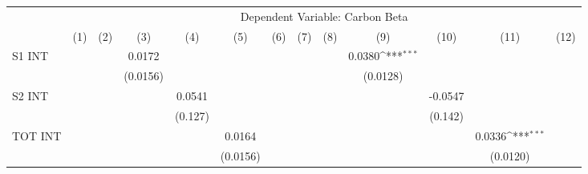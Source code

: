 {
\def\sym#1{\ifmmode^{#1}\else\(^{#1}\)\fi}
\begin{tabular}{l*{12}{c}}
\hline\hline
                    &\multicolumn{12}{c}{Dependent Variable: Carbon Beta}                                                                                                                                                                                                                   \\\cmidrule(lr){2-13}
                    &\multicolumn{1}{c}{(1)}         &\multicolumn{1}{c}{(2)}         &\multicolumn{1}{c}{(3)}         &\multicolumn{1}{c}{(4)}         &\multicolumn{1}{c}{(5)}         &\multicolumn{1}{c}{(6)}         &\multicolumn{1}{c}{(7)}         &\multicolumn{1}{c}{(8)}         &\multicolumn{1}{c}{(9)}         &\multicolumn{1}{c}{(10)}         &\multicolumn{1}{c}{(11)}         &\multicolumn{1}{c}{(12)}         \\
\hline
S1 INT              &                     &                     &      0.0172         &                     &                     &                     &                     &                     &      0.0380\sym{***}&                     &                     &                     \\
                    &                     &                     &    (0.0156)         &                     &                     &                     &                     &                     &    (0.0128)         &                     &                     &                     \\
S2 INT              &                     &                     &                     &      0.0541         &                     &                     &                     &                     &                     &     -0.0547         &                     &                     \\
                    &                     &                     &                     &     (0.127)         &                     &                     &                     &                     &                     &     (0.142)         &                     &                     \\
TOT INT             &                     &                     &                     &                     &      0.0164         &                     &                     &                     &                     &                     &      0.0336\sym{***}&                     \\
                    &                     &                     &                     &                     &    (0.0156)         &                     &                     &                     &                     &                     &    (0.0120)         &                     \\

\end{tabular}}
